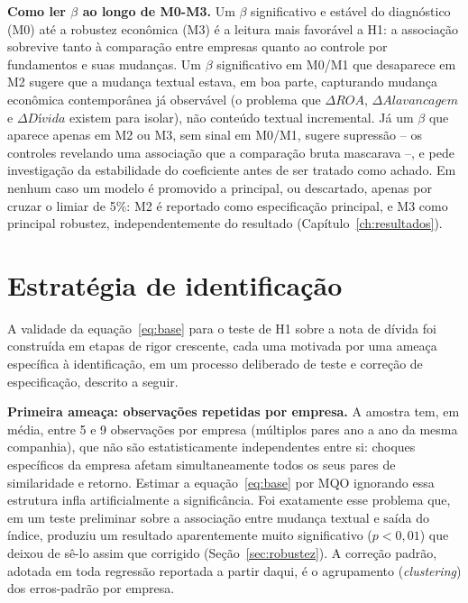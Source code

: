 \documentclass[a4paper,12pt]{report}
\begin{document}
\textbf{Como ler $\beta$ ao longo de M0-M3.} Um $\beta$ significativo e estável do diagnóstico (M0) até a robustez econômica (M3) é a leitura mais favorável a H1: a associação sobrevive tanto à comparação entre empresas quanto ao controle por fundamentos e suas mudanças. Um $\beta$ significativo em M0/M1 que desaparece em M2 sugere que a mudança textual estava, em boa parte, capturando mudança econômica contemporânea já observável (o problema que $\Delta\mathit{ROA}$, $\Delta\mathit{Alavancagem}$ e $\Delta\mathit{Dívida}$ existem para isolar), não conteúdo textual incremental. Já um $\beta$ que aparece apenas em M2 ou M3, sem sinal em M0/M1, sugere supressão -- os controles revelando uma associação que a comparação bruta mascarava --, e pede investigação da estabilidade do coeficiente antes de ser tratado como achado. Em nenhum caso um modelo é promovido a principal, ou descartado, apenas por cruzar o limiar de 5\%: M2 é reportado como especificação principal, e M3 como principal robustez, independentemente do resultado (Capítulo~\ref{ch:resultados}).

\section{Estratégia de identificação}
\label{sec:identificacao}

A validade da equação~\ref{eq:base} para o teste de H1 sobre a nota de dívida foi construída em etapas de rigor crescente, cada uma motivada por uma ameaça específica à identificação, em um processo deliberado de teste e correção de especificação, descrito a seguir.

\textbf{Primeira ameaça: observações repetidas por empresa.} A amostra tem, em média, entre 5 e 9 observações por empresa (múltiplos pares ano a ano da mesma companhia), que não são estatisticamente independentes entre si: choques específicos da empresa afetam simultaneamente todos os seus pares de similaridade e retorno. Estimar a equação~\ref{eq:base} por MQO ignorando essa estrutura infla artificialmente a significância. Foi exatamente esse problema que, em um teste preliminar sobre a associação entre mudança textual e saída do índice, produziu um resultado aparentemente muito significativo ($p<0{,}01$) que deixou de sê-lo assim que corrigido (Seção~\ref{sec:robustez}). A correção padrão, adotada em toda regressão reportada a partir daqui, é o agrupamento (\textit{clustering}) dos erros-padrão por empresa.
\end{document}
